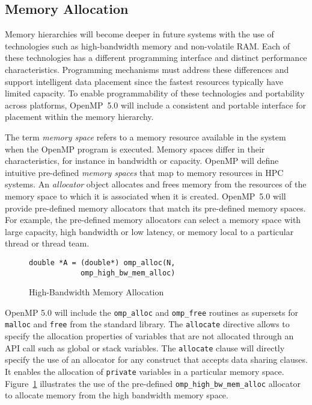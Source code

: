 \subsection{Memory Allocation}
\label{sub:allocators_and_hierarchical_memory}

Memory hierarchies will become deeper in future systems with the use of 
technologies such as high-bandwidth memory and non-volatile RAM. Each 
of these technologies has a different programming interface and distinct
performance characteristics. Programming mechanisms must address these 
differences and support intelligent data placement since the fastest resources
typically have limited capacity. To enable programmability of these 
technologies and portability across platforms, OpenMP~5.0 will include a 
consistent and portable interface for placement within the memory hierarchy.

The term \emph{memory space} refers to a memory resource available in the
system when the OpenMP program is executed. Memory spaces differ in their 
characteristics, for instance in bandwidth or capacity. OpenMP will define 
intuitive pre-defined \emph{memory spaces} that map to memory resources in 
HPC systems. An \emph{allocator} object allocates and frees memory from the 
resources of the memory space to which it is associated when it is created. 
OpenMP~5.0 will provide pre-defined memory allocators that match its 
pre-defined memory spaces. For example, the pre-defined memory allocators 
can select a memory space with large capacity, high bandwidth or low latency, 
or memory local to a particular thread or thread team.

\begin{figure}
\begin{verbatim}
double *A = (double*) omp_alloc(N,
            omp_high_bw_mem_alloc)
\end{verbatim}
\caption{High-Bandwidth Memory Allocation\label{fig:allocators}}
\end{figure}

OpenMP 5.0 will include the \texttt{omp\_alloc} and \texttt{omp\_free} 
routines as supersets for \texttt{malloc} and \texttt{free} from 
the standard library. The \texttt{allocate} directive allows to specify the allocation properties of variables that are not allocated through an API call such as global or stack variables. The \texttt{allocate} clause will directly specify 
the use of an allocator for any construct that accepts data sharing clauses.
It enables the allocation of \texttt{private} variables in a particular memory
space. Figure~\ref{fig:allocators} illustrates the use of the pre-defined
\texttt{omp\_high\_bw\_mem\_alloc} allocator to allocate memory from the 
high bandwidth memory space.

